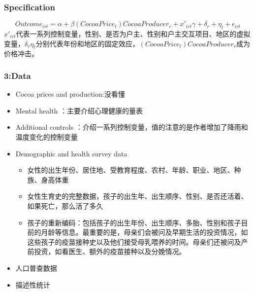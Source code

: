 \documentclass{beamer}
\begin{document}
\begin{frame}
	\frametitle{Specification}
	$$Outcome_{irt} = \alpha + \beta (CocoaPrice_t)CocoaProducer_r +x'_{irt}\gamma+\delta_r+\eta_t+\epsilon_{irt}$$
$x'_{irt}$代表一系列控制变量，性别、是否为户主、性别和户主交互项目、地区的虚拟变量，$\delta_r \eta_t$分别代表年份和地区的固定效应，$(CocoaPrice_t)CocoaProducer_r$成为价格冲击。


\end{frame}
\begin{frame}
	\frametitle{3:Data}
	\begin{itemize}
		\item Cocoa prices and production:没看懂
		\item Mental health ：主要介绍心理健康的量表
		\item Additional controls ：介绍一系列控制变量，值的注意的是作者增加了降雨和温度变化的控制变量
		\item Demographic and health survey data
		\begin{itemize}
			\item 女性的出生年份、居住地、受教育程度、农村、年龄、职业、地区、种族、身高体重
			\item 女性生育史的完整数据，孩子的出生年、出生顺序、性别、是否还活着、如果死亡，那么活了多久
			\item 孩子的重新编码：包括孩子的出生年份、出生顺序、多胎、性别和孩子目前的月龄等信息。最重要的是，母亲们会被问及早期生活的投资情况，如这些孩子的疫苗接种史以及他们接受母乳喂养的时间。母亲们还被问及产前投资，如看医生、额外的疫苗接种以及分娩情况。
		\end{itemize}
		\item 人口普查数据
		\item 描述性统计
	\end{itemize}
\end{frame}
\end{document}
